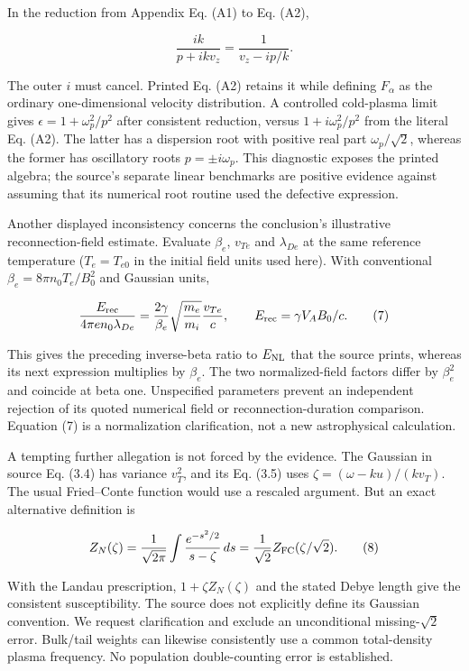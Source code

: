 In the reduction from Appendix Eq. (A1) to Eq. (A2),

\[
\frac{ik}{p+ikv_z}=\frac1{v_z-ip/k}.
\tag{6}
\]

The outer \(i\) must cancel. Printed Eq. (A2) retains it while defining
\(F_\alpha\) as the ordinary one-dimensional velocity distribution. A
controlled cold-plasma limit gives \(\epsilon=1+\omega_p^2/p^2\) after
consistent reduction, versus \(1+i\omega_p^2/p^2\) from the literal Eq.
(A2). The latter has a dispersion root with positive real part
\(\omega_p/\sqrt2\), whereas the former has oscillatory roots
\(p=\pm i\omega_p\). This diagnostic exposes the printed algebra; the
source's separate linear benchmarks are positive evidence against
assuming that its numerical root routine used the defective expression.

Another displayed inconsistency concerns the conclusion's illustrative
reconnection-field estimate. Evaluate \(\beta_e\), \(v_{Te}\) and
\(\lambda_{De}\) at the same reference temperature (\(T_e=T_{e0}\) in
the initial field units used here). With conventional
\(\beta_e=8\pi n_0T_e/B_0^2\) and Gaussian units,

\[
\frac{E_{\rm rec}}{4\pi en_0\lambda_{De}}
=\frac{2\gamma}{\beta_e}\sqrt{\frac{m_e}{m_i}}\frac{v_{Te}}c,
\qquad E_{\rm rec}=\gamma V_AB_0/c.
\tag{7}
\]

This gives the preceding inverse-beta ratio to \(E_{\rm NL}\) that the
source prints, whereas its next expression multiplies by \(\beta_e\).
The two normalized-field factors differ by \(\beta_e^2\) and coincide at
beta one. Unspecified parameters prevent an independent rejection of its
quoted numerical field or reconnection-duration comparison. Equation (7)
is a normalization clarification, not a new astrophysical calculation.

A tempting further allegation is not forced by the evidence. The
Gaussian in source Eq. (3.4) has variance \(v_T^2\), and its Eq. (3.5)
uses \(\zeta=(\omega-ku)/(kv_T)\). The usual Fried--Conte function would
use a rescaled argument. But an exact alternative definition is

\[
Z_N(\zeta)=\frac1{\sqrt{2\pi}}\int
\frac{e^{-s^2/2}}{s-\zeta}\,ds
=\frac1{\sqrt2}Z_{\rm FC}(\zeta/\sqrt2).
\tag{8}
\]

With the Landau prescription, \(1+\zeta Z_N(\zeta)\) and the stated
Debye length give the consistent susceptibility. The source does not
explicitly define its Gaussian convention. We request clarification and
exclude an unconditional missing-\(\sqrt2\) error. Bulk/tail weights can
likewise consistently use a common total-density plasma frequency. No
population double-counting error is established.

